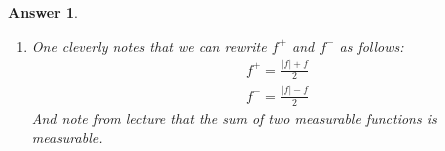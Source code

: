 \documentclass[12pt]{article}
\theoremstyle{colon}
\newtheorem*{answer}{Answer}
\begin{document}
\begin{answer}
\begin{enumerate}[label=(\roman*)]
\begin{align*}
        &f^+ + f^- = 0 - f = -f
      \end{align*}
      Thus, we have $f^+ + f^-$ defined piecewise as:
      $
      f = \begin{cases}
          f & f \geq 0 \\
          -f & f < 0
      \end{cases}
      $
      \par
      Which is the exact definition of $|f|$. Hence, $|f| = f^+ + f^-$
    \item One cleverly notes that we can rewrite $f^+$ and $f^-$ as follows:
      \begin{align*}
        &f^+ = \frac{|f| + f}{2} \\
        &f^- = \frac{|f| - f}{2}
      \end{align*}
      And note from lecture that the sum of two measurable functions is measurable.
  \end{enumerate}
\end{answer}
\end{document}
